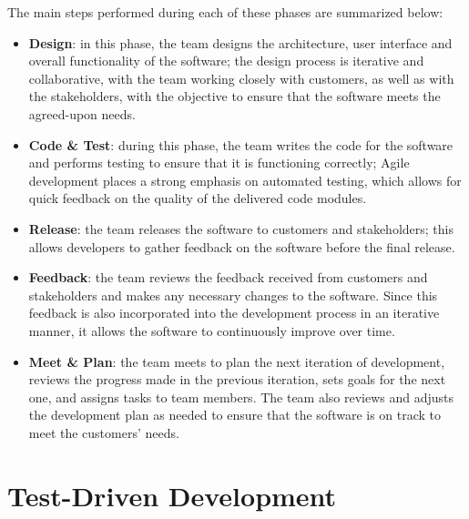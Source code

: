\noindent The main steps performed during each of these phases are summarized below:
\begin{itemize}
    \item \textbf{Design}: in this phase, the team designs the architecture, user interface and overall functionality of the software; the design process is iterative and collaborative, with the team working closely with customers, as well as with the stakeholders, with the objective to ensure that the software meets the agreed-upon needs.
    \item \textbf{Code \& Test}: during this phase, the team writes the code for the software and performs testing to ensure that it is functioning correctly; Agile development places a strong emphasis on automated testing, which allows for quick feedback on the quality of the delivered code modules.
    \item \textbf{Release}: the team releases the software to customers and stakeholders; this allows developers to gather feedback on the software before the final release.
    \item \textbf{Feedback}: the team reviews the feedback received from customers and stakeholders and makes any necessary changes to the software. Since this feedback is also incorporated into the development process in an iterative manner, it allows the software to continuously improve over time.
    \item \textbf{Meet \& Plan}: the team meets to plan the next iteration of development, reviews the progress made in the previous iteration, sets goals for the next one, and assigns tasks to team members. The team also reviews and adjusts the development plan as needed to ensure that the software is on track to meet the customers' needs.
\end{itemize}



\section{Test-Driven Development}
